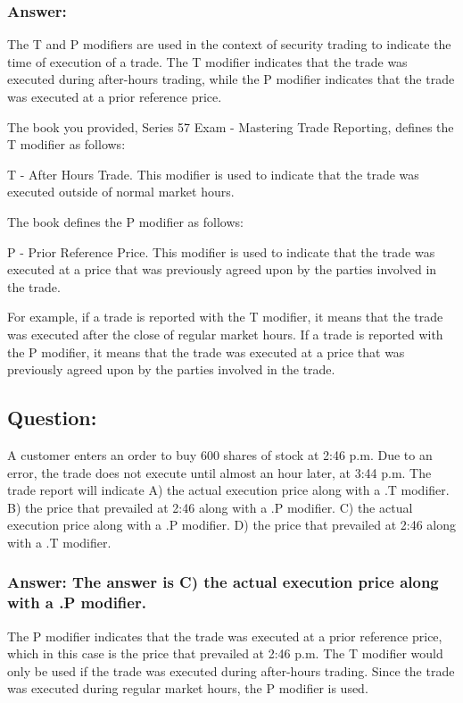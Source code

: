 \documentclass[11pt]{article}
\begin{document}
\subsubsection{Answer:}
\label{sec:org6cf8ffd}
The T and P modifiers are used in the context of security trading to indicate the time of execution of a trade. The T modifier indicates that the trade was executed during after-hours trading, while the P modifier indicates that the trade was executed at a prior reference price.

The book you provided, Series 57 Exam - Mastering Trade Reporting, defines the T modifier as follows:

T - After Hours Trade. This modifier is used to indicate that the trade was executed outside of normal market hours.

The book defines the P modifier as follows:

P - Prior Reference Price. This modifier is used to indicate that the trade was executed at a price that was previously agreed upon by the parties involved in the trade.

For example, if a trade is reported with the T modifier, it means that the trade was executed after the close of regular market hours. If a trade is reported with the P modifier, it means that the trade was executed at a price that was previously agreed upon by the parties involved in the trade.

\subsection{Question:}
\label{sec:org0ea540f}
A customer enters an order to buy 600 shares of stock at 2:46 p.m. Due to an error, the trade does not execute until almost an hour later, at 3:44 p.m. The trade report will indicate
A) the actual execution price along with a .T modifier.
B) the price that prevailed at 2:46 along with a .P modifier.
C) the actual execution price along with a .P modifier.
D) the price that prevailed at 2:46 along with a .T modifier.

\subsubsection{Answer: The answer is C) the actual execution price along with a .P modifier.}
\label{sec:org479b862}

The P modifier indicates that the trade was executed at a prior reference price, which in this case is the price that prevailed at 2:46 p.m. The T modifier would only be used if the trade was executed during after-hours trading. Since the trade was executed during regular market hours, the P modifier is used.
\end{document}
